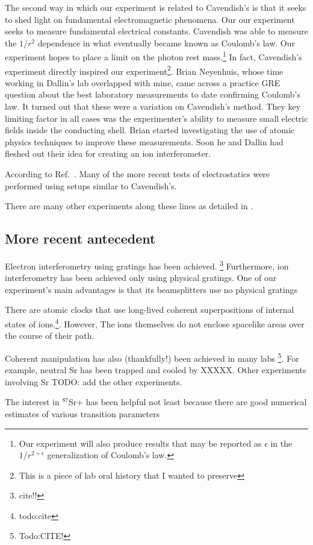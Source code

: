 The second way in which our experiment is related to Cavendish's is that it seeks to shed light on fundamental electromagnetic phenomena. Our our experiment seeks to measure fundamental electrical constants. Cavendish was able to measure the $1/r^2$ dependence in what eventually became known as Coulomb's law. Our experiment hopes to place a limit on the photon rest mass.\footnote{Our experiment will also produce results that may be reported as $\epsilon$ in the $1/r^{2+\epsilon}$ generalization of Coulomb's law.}
In fact, Cavendish's experiment directly inspired our experiment\footnote{This is a piece of lab oral history that I wanted to preserve}. Brian Neyenhuis, whose time working in Dallin's lab overlapped with mine, came across a practice GRE question about the best laboratory measurements to date confirming Coulomb's law. It turned out that these were a variation on Cavendish's method. They key limiting factor in all cases was the experimenter's ability to measure small electric fields inside the conducting shell. Brian started investigating the use of atomic physics techniques to improve these measurements. Soon he and Dallin had fleshed out their idea for creating an ion interferometer.  

According to Ref.\ \cite{jackson}. Many of the more recent tests of electrostatics were performed using setups similar to Cavendish's. 

There are many other experiments along these lines as detailed in \cite{PhotonMassSurvey}. 

\subsection{More recent antecedent}
Electron interferometry using gratings has been achieved. \footnote{cite!!} Furthermore, ion interferometry has been achieved only using physical gratings. One of our experiment's main advantages is that its beamsplitters use no physical gratings

There are atomic clocks that use long-lived coherent superpositions of internal states of ions.\footnote{todo:cite}. However, The ions themselves do not enclose spacelike areas over the course of their path.

Coherent manipulation has also (thankfully!) been achieved in many labs \footnote{Todo:CITE!}. For example, neutral Sr has been trapped and cooled by XXXXX. 
Other experiments involving Sr TODO: add the other experiments.

The interest in $^{87}$Sr+ has been helpful not least because there are good numerical estimates of various transition parameters \cite{safronovaTheory}


